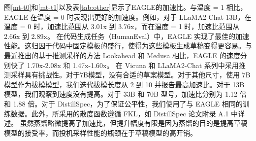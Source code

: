 \documentclass{article}
\theoremstyle{plain}
\theoremstyle{definition}
\theoremstyle{remark}
\begin{document}


图\ref{mt-t0}和\ref{mt-t1}以及表\ref{tab:other}显示了EAGLE的加速比。与温度 = 1 相比，EAGLE 在温度 = 0 时表现出更好的加速度。例如，对于 LLaMA2-Chat 13B，在温度 = 0 时，加速比范围从 3.01x 到 3.76x，而在温度 = 1 时，加速比范围从 2.66x 到 2.89x。 
在代码生成任务（HumanEval）中，EAGLE 实现了最佳的加速性能。这归因于代码中固定模板的盛行，使得为这些模板生成草稿变得更容易。与最近推出的基于推测采样的方法 Lookahead 和 Medusa 相比，EAGLE 的速度分别快了 1.70x-2.08x 和 1.47x-1.60x。 
在 Vicuna 和 LLaMA2-Chat 系列中采用推测采样具有挑战性。对于7B模型，没有合适的草案模型。对于其他尺寸，使用 7B 模型作为拔模模型，我们迭代拔模长度从 2 到 10 并报告最高加速比。对于 13B 模型，我们观察到速度没有提高。对于 33B 和 70B 型号，加速比分别为 1.12 倍和 1.88 倍。对于 DistillSpec，为了保证公平性，我们使用了与 EAGLE 相同的训练数据。此外，所采用的散度函数遵循 FKL，如 DistillSpec 论文附录 A.1 中详述。
虽然蒸馏略微提高了加速比，但提升幅度有限是因为蒸馏的目的是提高草稿模型的接受率，而投机采样性能的瓶颈在于草稿模型的高开销。 
\end{document}
